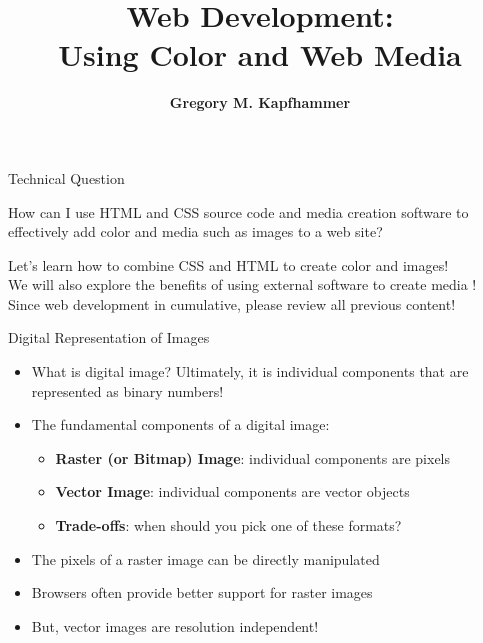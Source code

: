\documentclass[14pt,aspectratio=169]{beamer}
\title{Web Development: \\ Using Color and Web Media}
\author{{\bf Gregory M. Kapfhammer}}
\institute[shortinst]{{\bf Department of Computer Science, Allegheny College}}
\begin{document}
{
  \begin{frame}
    \titlepage
  \end{frame}
}

%
\begin{frame}{Technical Question}
  \hspace*{.25in}
  \vspace*{.1in}
  \begin{minipage}{5in}
    \begin{center}
      {\large How can I use HTML and CSS source code and media creation software to
      effectively add color and media such as images to a web site?}
    \end{center}
  \end{minipage}
  \vspace{2ex}
  \begin{center}
    \small Let's learn how to combine CSS and HTML to create color and images!\\
    \small We will also explore the benefits of using external software to
    create media !\\
    \small Since web development in cumulative, please review all previous content!\\
  \end{center}
\end{frame}

%
\begin{frame}{Digital Representation of Images}
  \begin{itemize}
    \item What is digital image? Ultimately, it is individual components that
      are represented as binary numbers!
      \vspace*{-.15in}
    \item The fundamental components of a digital image:
      \begin{itemize}
        \item {\bf Raster (or Bitmap) Image}: individual components are pixels
        \item {\bf Vector Image}: individual components are vector objects
        \item {\bf Trade-offs}: when should you pick one of these formats?
      \end{itemize}
      \vspace*{-.2in}
    \item The pixels of a raster image can be directly manipulated
      \vspace*{-.2in}
    \item Browsers often provide better support for raster images
      \vspace*{-.2in}
    \item But, vector images are resolution independent!
  \end{itemize}
\end{frame}
\end{document}
